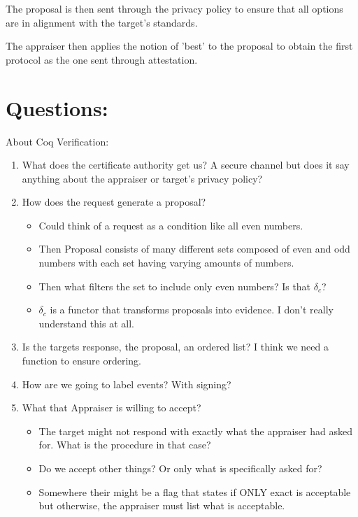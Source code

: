 \documentclass[10pt]{report}
\newcommand{\squash}{\itemsep=0pt\parskip=0pt}
\begin{document}
The proposal is then sent through the privacy policy to ensure that
all options are in alignment with the target's standards. 

The appraiser then applies the notion of 'best' to the proposal to obtain
the first protocol as the one sent through attestation.

\chapter{Questions:}

About Coq Verification:

\begin{enumerate}
  \item What does the certificate authority get us? A secure channel but 
        does it say anything about the appraiser or target's
        privacy policy?
  \item How does the request generate a proposal? 
  \begin{itemize}
    \item Could think of a request as a condition like all even numbers.
    \item Then Proposal consists of many different sets composed of even
          and odd numbers with each set having varying amounts of numbers.
    \item Then what filters the set to include only even numbers?
          Is that $\delta_c$?
    \item $\delta_c$ is a functor that transforms proposals into evidence.
          I don't really understand this at all.  
  \end{itemize}
  \item Is the targets response, the proposal, an ordered list?
        I think we need a function to ensure ordering.
  \item How are we going to label events? With signing?
  \item What that Appraiser is willing to accept?
	\begin{itemize}
	\squash
	\item The target might not respond with exactly what the appraiser
          had asked for. What is the procedure in that case?
	\item Do we accept other things? Or only what is specifically asked for?
	\item Somewhere their might be a flag that states if ONLY exact is
          acceptable but otherwise, the appraiser must list what is acceptable. 
	\end{itemize}
\end{enumerate}
\end{document}
